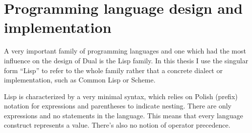 \section{Programming language design and implementation}
A very important family of programming languages and one which had the most
influence on the design of Dual is the Lisp family. In this thesis I use the
singular form ``Lisp'' to refer to the whole family rather that a concrete
dialect or implementation, such as Common Lisp or Scheme.

Lisp is characterized by a very minimal syntax, which relies on Polish (prefix)
notation for expressions and parentheses to indicate nesting. There are only
expressions and no statements in the language. This means that every language
construct represents a value. There's also no notion of operator precedence.

